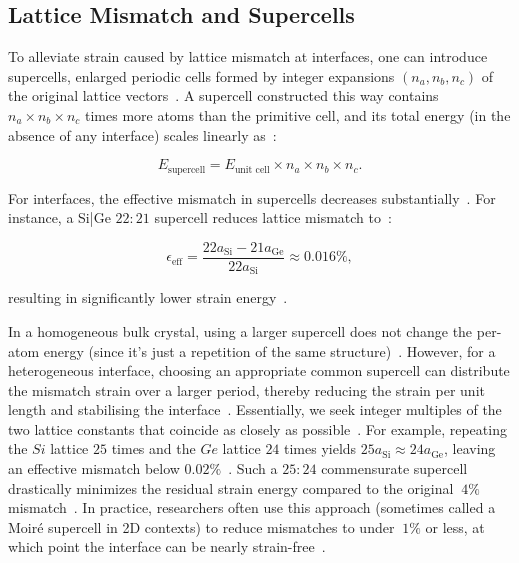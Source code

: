 \subsection*{Lattice Mismatch and Supercells} \label{sec:lattice_mismatching}

To alleviate strain caused by lattice mismatch at interfaces, one can introduce supercells, enlarged periodic cells formed by integer expansions $(n_a, n_b, n_c)$ of the original lattice vectors~\nocite{}.
A supercell constructed this way contains $n_a \times n_b \times n_c$ times more atoms than the primitive cell, and its total energy (in the absence of any interface) scales linearly as~\nocite{}:

\begin{equation}
    E_{\text{supercell}} = E_{\text{unit cell}} \times n_a \times n_b \times n_c.
\end{equation}

For interfaces, the effective mismatch in supercells decreases substantially~\nocite{}.
For instance, a Si|Ge $22{:}21$ supercell reduces lattice mismatch to~\nocite{}:

\begin{equation}
    \epsilon_{\text{eff}} = \frac{22a_{\mathrm{Si}} - 21a_{\mathrm{Ge}}}{22a_{\mathrm{Si}}} \approx 0.016\%,
\end{equation}

resulting in significantly lower strain energy~\cite{raffle_paper}.

\newpage In a homogeneous bulk crystal, using a larger supercell does not change the per-atom energy (since it's just a repetition of the same structure)~\nocite{}.
However, for a heterogeneous interface, choosing an appropriate common supercell can distribute the mismatch strain over a larger period, thereby reducing the strain per unit length and stabilising the interface~\nocite{}.
Essentially, we seek integer multiples of the two lattice constants that coincide as closely as possible~\nocite{}.
For example, repeating the $Si$ lattice $25$ times and the $Ge$ lattice $24$ times yields $25a_{\mathrm{Si}}\approx 24a_{\mathrm{Ge}}$, leaving an effective mismatch below $0.02\%$~\nocite{}.
Such a $25{:}24$ commensurate supercell drastically minimizes the residual strain energy compared to the original $~4\%$ mismatch~\nocite{}.
In practice, researchers often use this approach (sometimes called a Moiré supercell in 2D contexts) to reduce mismatches to under $~1\%$ or less, at which point the interface can be nearly strain-free~\nocite{}.

